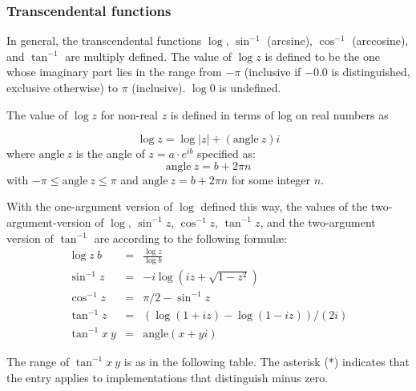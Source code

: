 \subsubsection{Transcendental functions}
\label{transcendentalfunctions}

In general, the transcendental functions $\log$, $\sin^{-1}$
(arcsine), $\cos^{-1}$ (arccosine), and $\tan^{-1}$ are multiply
defined.  The value of $\log z$ is defined to be the one whose
imaginary part lies in the range from $-\pi$ (inclusive if $-0.0$ is
distinguished, exclusive otherwise) to $\pi$ (inclusive).  $\log 0$ is
undefined.

The value of $\log z$ for non-real $z$ is defined in terms of log on real numbers as 

\begin{displaymath}
\log z = \log |z| + (\mathrm{angle}~z)i
\end{displaymath}
%
where $\mathrm{angle}~z$ is the angle of $z = a\cdot e^{ib}$ specified
as:
$$\mathrm{angle}~z = b+2\pi n$$
with $-\pi \leq \mathrm{angle}~z\leq \pi$ and $\mathrm{angle}~z =
b+2\pi n$ for some integer $n$.

With the one-argument version of $\log$ defined this way, the values
of the two-argument-version of $\log$, $\sin^{-1} z$, $\cos^{-1} z$,
$\tan^{-1} z$, and the two-argument version of $\tan^{-1}$ are
according to the following formul\ae:
\begin{eqnarray*}
\log z~b &=& \frac{\log z}{\log b}\\
\sin^{-1} z &=& -i \log (i z + \sqrt{1 - z^2})\\
\cos^{-1} z &=& \pi / 2 - \sin^{-1} z\\
\tan^{-1} z &=& (\log (1 + i z) - \log (1 - i z)) / (2 i)\\
\tan^{-1} x~y &=& \mathrm{angle}(x+ yi)
\end{eqnarray*}

The range of $\tan^{-1} x~y$ is as in the following table. The
asterisk (*) indicates that the entry applies to implementations that
distinguish minus zero.

